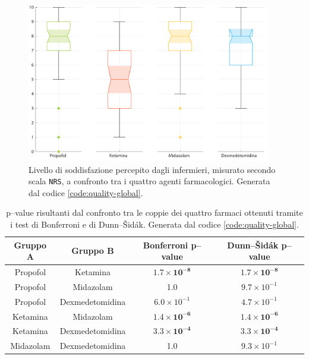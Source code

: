
\vfill

\begin{figure}[!h]
    \centering
    \includegraphics[width=0.95\textwidth]{Figure/qualita-colorful.pdf}
    \caption{Livello di soddisfazione percepito dagli infermieri, misurato secondo scala \texttt{NRS}, a confronto tra i quattro agenti farmacologici. Generata dal codice \ref{code:quality-global}.}
    \label{fig:qualitascolorful}
\end{figure}

\vfill\vfill


\bgroup
\def\arraystretch{1.5}
\begin{table}[!h]
    \centering
    \begin{tabular}{c|c|c|c}
         Gruppo A & Gruppo B & Bonferroni p--value & Dunn--Šidák p--value\\ \hline
       Propofol & Ketamina & $\mathbf{1.7\times10^{-8}}$ & $\mathbf{1.7\times10^{-8}}$ \\
       Propofol & Midazolam  & 1.0 & $9.7 \times 10^{-1}$\\
       Propofol & Dexmedetomidina & $6.0 \times 10^{-1}$ & $4.7 \times 10^{-1}$\\
       Ketamina & Midazolam & $\mathbf{1.4\times10^{-6}}$ & $\mathbf{1.4\times10^{-6}}$\\
       Ketamina & Dexmedetomidina & $\mathbf{3.3\times10^{-4}}$ & $\mathbf{3.3\times10^{-4}}$\\
       Midazolam & Dexmedetomidina & 1.0 & $9.3 \times 10^{-1}$\\
       
    \end{tabular}
    \caption{p--value risultanti dal confronto tra le coppie dei quattro farmaci ottenuti tramite i test di Bonferroni e di Dunn--Šidák. Generata dal codice \ref{code:quality-global}.}
    \label{tab:qualitatest}
\end{table}
\egroup

